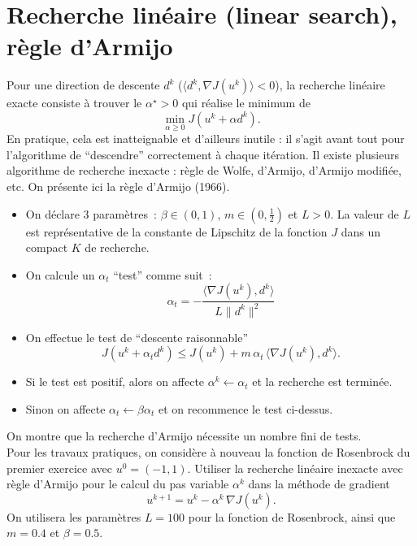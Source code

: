 \documentclass[11pt, a4paper]{amsart}
\begin{document}
\section{Recherche linéaire (linear search), règle d'Armijo}
%
Pour une direction de descente $d^k$ 
($\langle d^k,\nabla J(u^k)\rangle<0$),
la recherche linéaire exacte consiste à trouver le $\alpha^\star>0$
qui réalise le minimum de 
\[
\min_{\alpha\geq 0} J(u^k + \alpha d^k).
\] 
En pratique, cela est inatteignable et d'ailleurs inutile : il s'agit 
avant tout pour l'algorithme de ``descendre'' correctement à chaque
itération. Il existe plusieurs algorithme de recherche inexacte : 
règle de Wolfe, d'Armijo,  d'Armijo modifiée, etc. On présente ici
la règle d'Armijo (1966). 
%
\begin{itemize}
%
\item On déclare 3 paramètres~: $\beta\in (0,1)$, 
$m\in (0,\frac{1}{2})$ et $L>0$. La valeur de $L$ est 
représentative de la constante de Lipschitz de la fonction $J$
dans un compact $K$ de recherche.
%
\item On calcule un $\alpha_t$ ``test'' comme suit~:
\[
\alpha_t = -\frac{\langle \nabla J(u^k),d^k \rangle}{L \|d^k\|^2}
\]
\item On effectue le test de ``descente raisonnable''
\[
J(u^k + \alpha_t d^k) \leq J(u^k) 
+ m\, \alpha_t\, \langle \nabla J(u^k),d^k \rangle.
\]
\item Si le test est positif, alors  on affecte
$\alpha^k \leftarrow \alpha_t$ et la recherche est terminée.
%
\item Sinon on affecte $\alpha_t \leftarrow \beta \alpha_t$ et on recommence le test ci-dessus.
%
\end{itemize}
%
On montre que la recherche d'Armijo nécessite un nombre fini de tests. \\

Pour les travaux pratiques, on considère à nouveau la fonction de Rosenbrock du premier exercice avec $u^0=(-1,1)$.
Utiliser la recherche linéaire inexacte avec règle d'Armijo pour le calcul
du pas variable $\alpha^k$ dans la méthode de gradient
\[
u^{k+1} = u^k - \alpha^k \, \nabla J(u^k).
\] 
On utilisera les paramètres $L=100$ pour la fonction de Rosenbrock, 
ainsi que $m=0.4$ et $\beta=0.5$.
%
\end{document}
